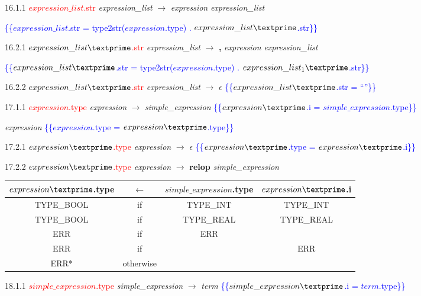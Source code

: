 \documentclass[10pt]{article}
\begin{document}
16.1.1 \textcolor{red}{$expression\_list$.str} \emph{expression\_list} $\rightarrow$ \emph{expression} \emph{expression\_list\textprime}

\textcolor{blue}{\{\{$expression\_list$.str = type2str($expression$.type) . $expression\_list\textprime$.str\}\}}

16.2.1 \textcolor{red}{$expression\_list\textprime$.str} \emph{expression\_list\textprime} $\rightarrow$ \textbf{,} \emph{expression} \emph{expression\_list\textprime}

\textcolor{blue}{\{\{$expression\_list\textprime$.str = type2str($expression$.type) . $expression\_list_1\textprime$.str\}\}}

16.2.2 \textcolor{red}{$expression\_list\textprime$.str} \emph{expression\_list\textprime} $\rightarrow$ $\epsilon$ \textcolor{blue}{\{\{$expression\_list\textprime$.str = ``''\}\}}

17.1.1 \textcolor{red}{$expression$.type} \emph{expression} $\rightarrow$ \emph{simple\_expression} \textcolor{blue}{\{\{$expression\textprime$.i = $simple\_expression$.type\}\}}

\emph{expression\textprime} \textcolor{blue}{\{\{$expression$.type = $expression\textprime$.type\}\}}

17.2.1 \textcolor{red}{$expression\textprime$.type} \emph{expression\textprime} $\rightarrow$ $\epsilon$ \textcolor{blue}{\{\{$expression\textprime$.type = $expression\textprime$.i\}\}}

17.2.2 \textcolor{red}{$expression\textprime$.type} \emph{expression\textprime} $\rightarrow$ \textbf{relop} \emph{simple\_expression}

\begin{tabular}[t]{|c|c|c|c|}
  \hline

  $expression\textprime$.type & \textbf{$\leftarrow$} & $simple\_expression$.type & $expression\textprime$.i \\

  \hline

  TYPE_BOOL & if & TYPE_INT & TYPE_INT \\
  TYPE_BOOL & if & TYPE_REAL & TYPE_REAL \\
  ERR & if & ERR & \\
  ERR & if & & ERR \\
  ERR* & otherwise & & \\
  \hline

\end{tabular}

18.1.1 \textcolor{red}{$simple\_expression$.type} \emph{simple\_expression} $\rightarrow$ \emph{term} \textcolor{blue}{\{\{$simple\_expression\textprime$.i = $term$.type\}\}}
\end{document}
